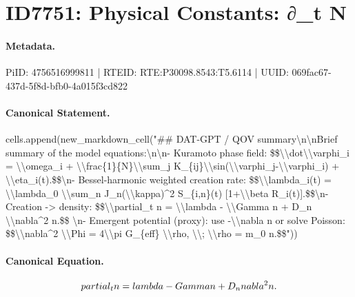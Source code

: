\section*{ID7751: Physical Constants: ∂\_t N}
\paragraph{Metadata.}
PiID: 4756516999811 | RTEID: RTE:P30098.8543:T5.6114 | UUID: 069fac67-437d-5f8d-bfb0-4a015f3cd822

\paragraph{Canonical Statement.}
cells.append(new\_markdown\_cell("\#\# DAT-GPT / QOV summary\textbackslash{}n\textbackslash{}nBrief summary of the model equations:\textbackslash{}n\textbackslash{}n- Kuramoto phase field: \$\$\textbackslash{}\textbackslash{}dot\textbackslash{}\textbackslash{}varphi\_i = \textbackslash{}\textbackslash{}omega\_i + \textbackslash{}\textbackslash{}frac\{1\}\{N\}\textbackslash{}\textbackslash{}sum\_j K\_\{ij\}\textbackslash{}\textbackslash{}sin(\textbackslash{}\textbackslash{}varphi\_j-\textbackslash{}\textbackslash{}varphi\_i) + \textbackslash{}\textbackslash{}eta\_i(t).\$\$\textbackslash{}n- Bessel-harmonic weighted creation rate: \$\$\textbackslash{}\textbackslash{}lambda\_i(t) = \textbackslash{}\textbackslash{}lambda\_0 \textbackslash{}\textbackslash{}sum\_n J\_n(\textbackslash{}\textbackslash{}kappa)\textasciicircum{}2 S\_\{i,n\}(t) [1+\textbackslash{}\textbackslash{}beta R\_i(t)].\$\$\textbackslash{}n- Creation -> density: \$\$\textbackslash{}\textbackslash{}partial\_t n = \textbackslash{}\textbackslash{}lambda - \textbackslash{}\textbackslash{}Gamma n + D\_n \textbackslash{}\textbackslash{}nabla\textasciicircum{}2 n.\$\$ \textbackslash{}n- Emergent potential (proxy): use -\textbackslash{}\textbackslash{}nabla n or solve Poisson: \$\$\textbackslash{}\textbackslash{}nabla\textasciicircum{}2 \textbackslash{}\textbackslash{}Phi = 4\textbackslash{}\textbackslash{}pi G\_\{eff\} \textbackslash{}\textbackslash{}rho, \textbackslash{}\textbackslash{}; \textbackslash{}\textbackslash{}rho = m\_0 n.\$\$"))

\paragraph{Canonical Equation.}
\[
\\partial_t n = \\lambda - \\Gamma n + D_n \\nabla^2 n.
\]

